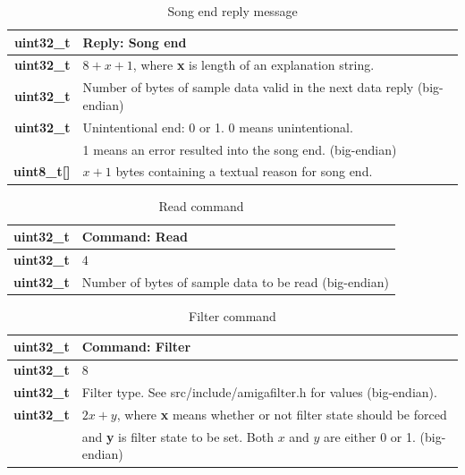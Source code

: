\documentclass{article}
\begin{document}
\begin{table}
\begin{center}
\caption{Song end reply message}
\label{tab:reply_song_end}
\begin{tabular}{|r|l|}
\hline
\textbf{uint32\_t} & Reply: Song end\\
\hline
\textbf{uint32\_t} & $8 + x + 1$, where \textbf{x} is length of an explanation string.\\
\hline
\textbf{uint32\_t} & Number of bytes of sample data valid in the next data reply (big-endian)\\
\hline
\textbf{uint32\_t} & Unintentional end: 0 or 1. 0 means unintentional.\\
 & 1 means an error resulted into the song end. (big-endian)\\
\hline
\textbf{uint8\_t[]} & $x + 1$ bytes containing a textual reason for song end.\\
\hline
\end{tabular}
\end{center}
\end{table}

\begin{table}
\begin{center}
\caption{Read command}
\label{tab:command_read}
\begin{tabular}{|r|l|}
\hline
\textbf{uint32\_t} & Command: Read\\
\hline
\textbf{uint32\_t} & 4\\
\hline
\textbf{uint32\_t} & Number of bytes of sample data to be read (big-endian)\\
\hline
\end{tabular}
\end{center}
\end{table}

\begin{table}
\begin{center}
\caption{Filter command}
\label{tab:command_filter}
\begin{tabular}{|r|l|}
\hline
\textbf{uint32\_t} & Command: Filter\\
\hline
\textbf{uint32\_t} & 8\\
\hline
\textbf{uint32\_t} & Filter type. See \mbox{src/include/amigafilter.h} for values (big-endian).\\
\hline
\textbf{uint32\_t} & $2x+y$, where \textbf{x} means whether or not filter state should be forced\\
 & and \textbf{y} is filter state to be set. Both $x$ and $y$ are either 0 or 1. (big-endian)\\
\hline
\end{tabular}
\end{center}
\end{table}
\end{document}
